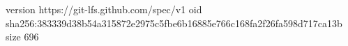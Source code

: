 version https://git-lfs.github.com/spec/v1
oid sha256:383339d38b54a315872e2975c5fbe6b16885e766c168fa2f26fa598d717ca13b
size 696
